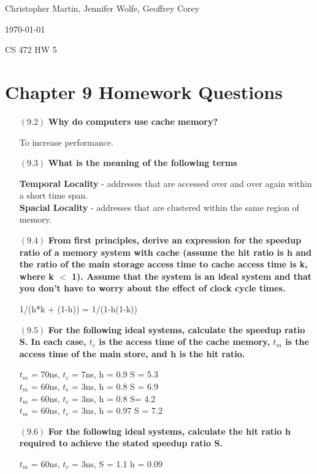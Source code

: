 \documentclass[letterpaper,10pt,titlepage]{article}
\def\name{Christopher Martin, Jennifer Wolfe, Geoffrey Corey}
\begin{document}
\hfill \name

\hfill \today

\hfill CS 472 HW 5

\section*{Chapter 9	 Homework Questions}


\begin{enumerate}
\item[$(9.2)$] \textbf{Why do computers use cache memory?}

To increase performance.

\item[$(9.3)$] \textbf{What is the meaning of the following terms}

\textbf{Temporal Locality} - addresses that are accessed over and over again within a short time span.\\
\textbf{Spacial Locality} - addresses that are clustered within the same region of memory.

\item[$(9.4)$] \textbf{From first principles, derive an expression for the speedup ratio of a memory system with cache (assume the hit ratio is h and the ratio of the main storage access time to cache access time is k, where k $<$ 1). Assume that the system is an ideal system and that you don’t have to worry about the effect of clock cycle times.}

1/(h*k + (1-h)) = 1/(1-h(1-k))

\item[$(9.5)$] \textbf{For the following ideal systems, calculate the speedup ratio S. In each case, $t_c$ is the access time of the cache memory, $t_m$ is the access time of the main store, and h is the hit ratio.}

$t_m$ = 70ns, $t_c$ = 7ns, h = 0.9
S = 5.3\\

$t_m $ = 60ns, $t_c$ = 3ns, h = 0.8
S = 6.9\\

$t_m$ = 60ns, $t_c$ = 3ns, h = 0.8
S= 4.2\\

$t_m$ = 60ns, $t_c$ = 3ns, h = 0.97
S = 7.2

\item[$(9.6)$] \textbf{For the following ideal systems, calculate the hit ratio h required to achieve the stated speedup ratio S.}

$t_m$ = 60ns, $t_c$ = 3ns, S = 1.1
h = 0.09\\


\end{enumerate}
\end{document}
